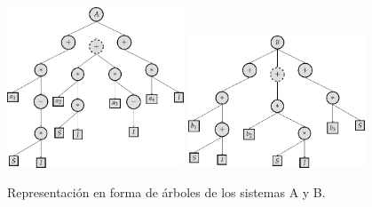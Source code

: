 \begin{center}
    \begin{figure}[H]
        \centering
        \includegraphics[width=0.47\textwidth]{"figures/cross_example_1.pdf"}
        \qquad
        \includegraphics[width=0.47\textwidth]{"figures/cross_example_2.pdf"}
        \caption{Representación en forma de árboles de los sistemas A y B.}
        \label{tikzpicture:cross_example_1}
    \end{figure}
\end{center}


